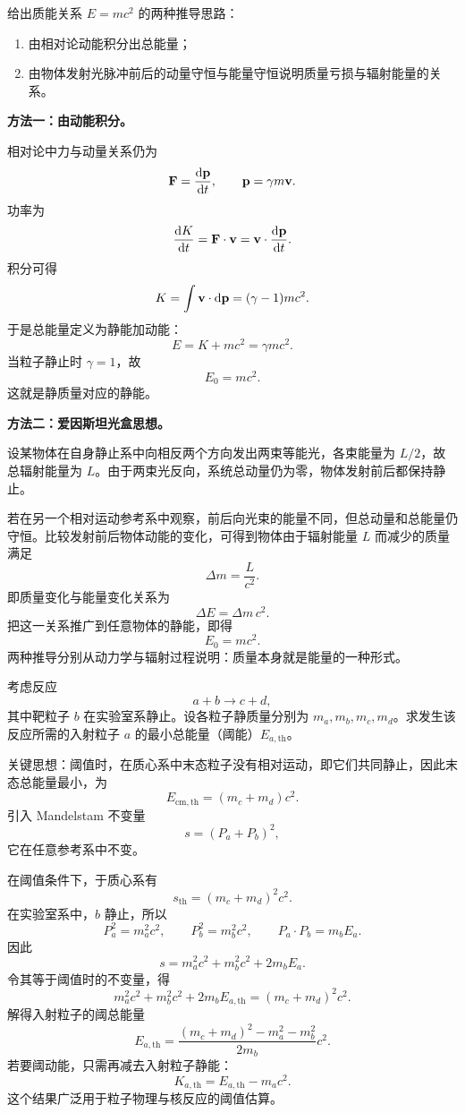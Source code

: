 \begin{problem}
给出质能关系 $E=mc^2$ 的两种推导思路：
\begin{enumerate}
  \item 由相对论动能积分出总能量；
  \item 由物体发射光脉冲前后的动量守恒与能量守恒说明质量亏损与辐射能量的关系。
\end{enumerate}
\begin{solution}
\textbf{方法一：由动能积分。}

相对论中力与动量关系仍为
\[
\vb{F}=\dv{\vb{p}}{t},
\qquad
\vb{p}=\gamma m\vb{v}.
\]
功率为
\[
\dv{K}{t}=\vb{F}\cdot\vb{v}=\vb{v}\cdot\dv{\vb{p}}{t}.
\]
积分可得
\[
K=\int \vb{v}\cdot \dd{\vb{p}}= (\gamma-1)mc^2.
\]
于是总能量定义为静能加动能：
\[
E=K+mc^2=\gamma mc^2.
\]
当粒子静止时 $\gamma=1$，故
\[
E_0=mc^2.
\]
这就是静质量对应的静能。

\textbf{方法二：爱因斯坦光盒思想。}

设某物体在自身静止系中向相反两个方向发出两束等能光，各束能量为 $L/2$，故总辐射能量为 $L$。由于两束光反向，系统总动量仍为零，物体发射前后都保持静止。

若在另一个相对运动参考系中观察，前后向光束的能量不同，但总动量和总能量仍守恒。比较发射前后物体动能的变化，可得到物体由于辐射能量 $L$ 而减少的质量满足
\[
\Delta m=\frac{L}{c^2}.
\]
即质量变化与能量变化关系为
\[
\Delta E=\Delta m\,c^2.
\]
把这一关系推广到任意物体的静能，即得
\[
E_0=mc^2.
\]
两种推导分别从动力学与辐射过程说明：质量本身就是能量的一种形式。
\end{solution}
\end{problem}

\begin{problem}
考虑反应
\[
a+b\to c+d,
\]
其中靶粒子 $b$ 在实验室系静止。设各粒子静质量分别为 $m_a,m_b,m_c,m_d$。求发生该反应所需的入射粒子 $a$ 的最小总能量（阈能）$E_{a,\mathrm{th}}$。
\begin{solution}
关键思想：阈值时，在质心系中末态粒子没有相对运动，即它们共同静止，因此末态总能量最小，为
\[
E_{\mathrm{cm,th}}=(m_c+m_d)c^2.
\]
引入 Mandelstam 不变量
\[
 s=(P_a+P_b)^2,
\]
它在任意参考系中不变。

在阈值条件下，于质心系有
\[
 s_{\mathrm{th}}=(m_c+m_d)^2c^2.
\]
在实验室系中，$b$ 静止，所以
\[
P_a^2=m_a^2c^2,
\qquad
P_b^2=m_b^2c^2,
\qquad
P_a\cdot P_b=m_bE_a.
\]
因此
\[
 s=m_a^2c^2+m_b^2c^2+2m_bE_a.
\]
令其等于阈值时的不变量，得
\[
 m_a^2c^2+m_b^2c^2+2m_bE_{a,\mathrm{th}}=(m_c+m_d)^2c^2.
\]
解得入射粒子的阈总能量
\[
 E_{a,\mathrm{th}}=\frac{(m_c+m_d)^2-m_a^2-m_b^2}{2m_b}c^2.
\]
若要阈动能，只需再减去入射粒子静能：
\[
 K_{a,\mathrm{th}}=E_{a,\mathrm{th}}-m_ac^2.
\]
这个结果广泛用于粒子物理与核反应的阈值估算。
\end{solution}
\end{problem}
